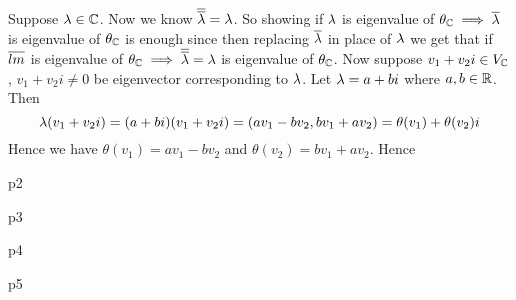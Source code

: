 \documentclass[a4paper, 11pt]{article}
\begin{document}
{\begin{itemize}[label=$\bullet$]
Suppose $\lambda \in \mathbb{C}$. Now we know $\overline{\overline{\lambda}}=\lambda$. So showing if $\lambda$ is eigenvalue of $\theta_{\mathbb{C}}\implies \overline{\lambda}$ is eigenvalue of $\theta_{\mathbb{C}}$ is enough since then replacing $\overline{\lambda}$ in place of $\lambda$ we get that if $\overline{lm}$ is eigenvalue of $\theta_{\mathbb{C}}\implies \overline{\overline{\lambda}}=\lambda$ is eigenvalue of $\theta_{\mathbb{C}}$. Now suppose $v_1+v_2i\in V_{\mathbb{C}}$, $v_1+v_2i\neq  0$ be eigenvector corresponding to $\lambda$. Let $\lambda=a+bi$ where $a,b\in \mathbb{R}$. Then $$\lambda(v_1+v_2i)=(a+bi)(v_1+v_2i)=(av_1-bv_2,bv_1+av_2)=\theta(v_1)+\theta(v_2)i$$Hence we have $\theta(v_1)=av_1-bv_2$ and $\theta(v_2)=bv_1+av_2$. Hence 
\end{itemize}
}

\begin{problem}{%
	}{p2%
	}

\end{problem}
\solve{	
}

\begin{problem}{%
	}{p3%
	}

\end{problem}
\solve{

}


\begin{problem}{%
	}{p4%
	}

\end{problem}
\solve{
}


\begin{problem}{%
}{p5%
}

\end{problem}
\solve{


}
\end{document}
